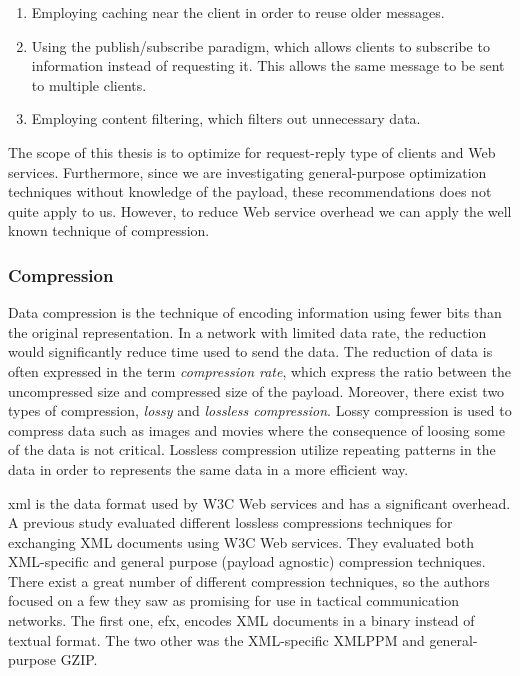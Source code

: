 \begin{enumerate}
    \item Employing caching near the client in order to reuse older messages.
    \item Using the publish/subscribe paradigm, which allows clients to subscribe to
    information instead of requesting it. This allows the same message to be sent
    to multiple clients.
    \item Employing content filtering, which filters out unnecessary data.
\end{enumerate}

The scope of this thesis is to optimize for request-reply type of clients
and Web services. Furthermore, since we are investigating general-purpose
optimization techniques without knowledge of the payload, these
recommendations does not quite apply to us. However, to reduce Web service
overhead we can apply the well known technique of compression.

\subsubsection{Compression}

Data compression is the technique of encoding information using fewer bits than
the original representation. In a network with limited data rate, the reduction
would significantly reduce time used to send the data. The reduction of data is
often expressed in the term \textit{compression rate}, which express the ratio
between the uncompressed size and compressed size of the payload.  Moreover,
there exist two types of compression, \textit{lossy} and \textit{lossless
compression}. Lossy compression is used to compress data such as images and
movies where the consequence of loosing some of the data is not critical.
Lossless compression utilize repeating patterns in the data in order to
represents the same data in a more efficient way.

\gls{xml} is the data format used by W3C Web services and has a significant
overhead. A previous study evaluated different lossless compressions techniques
for exchanging XML documents using W3C Web services\cite{johnsen-compression}.
They evaluated both XML-specific and general purpose (payload agnostic)
compression techniques. There exist a great number of different compression
techniques, so the authors focused on a few they saw as promising for use in
tactical communication networks. The first one, \gls{efx}, encodes XML documents
in a binary instead of textual format. The two other was the XML-specific XMLPPM
and general-purpose GZIP.

